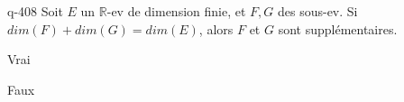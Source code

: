 \begin{truefalse}{q-408}
Soit $E$ un $\mathbb R$-ev de dimension finie, et $F,G$ des sous-ev.  Si $dim(F)+dim(G)=dim(E)$, alors $F$ et $G$ sont supplémentaires.
\item Vrai
\item* Faux
\end{truefalse}

